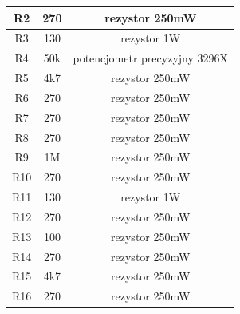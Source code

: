 \documentclass[12pt]{article}
\begin{document}
\begin{minipage}[t]{0.45\linewidth}
\begin{tabular}{|c|c|c|}
R2 & 270 & rezystor 250mW \\
\hline
R3 & 130 & rezystor 1W \\
\hline
R4 & 50k & potencjometr precyzyjny 3296X \\
\hline
R5 & 4k7 & rezystor 250mW \\
\hline
R6 & 270 & rezystor 250mW \\
\hline
R7 & 270 & rezystor 250mW \\
\hline
R8 & 270 & rezystor 250mW \\
\hline
R9 & 1M & rezystor 250mW \\
\hline
R10 & 270 & rezystor 250mW \\
\hline
R11 & 130 & rezystor 1W \\
\hline
R12 & 270 & rezystor 250mW \\
\hline
R13 & 100 & rezystor 250mW \\
\hline
R14 & 270 & rezystor 250mW \\
\hline
R15 & 4k7 & rezystor 250mW \\
\hline
R16 & 270 & rezystor 250mW \\
\hline
\end{tabular}
\end{minipage}
\end{document}
